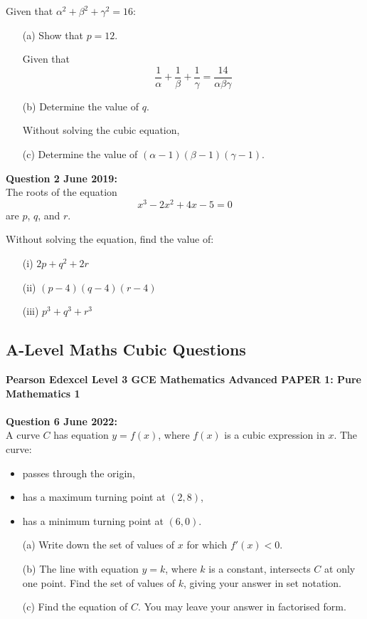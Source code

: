 \documentclass[12pt]{article}
\begin{document}
Given that \( \alpha^2 + \beta^2 + \gamma^2 = 16 \):

\begin{enumerate}
    \item[(a)] Show that \( p = 12 \).
    
    Given that 
    \[\frac{1}{\alpha} + \frac{1}{\beta} + \frac{1}{\gamma} = \frac{14}{\alpha \beta \gamma}\]
    \item[(b)] Determine the value of \( q \).
    
    Without solving the cubic equation,
    \item[(c)] Determine the value of \( (\alpha - 1)(\beta - 1)(\gamma - 1) \).
\end{enumerate}

\textbf{Question 2 June 2019:}\\
The roots of the equation 
\[x^3 - 2x^2 + 4x - 5 = 0\]
are \( p \), \( q \), and \( r \).

Without solving the equation, find the value of:
\begin{enumerate}
    \item[(i)] \( 2p + q^2 + 2r \)
    \item[(ii)] \( (p - 4)(q - 4)(r - 4) \)
    \item[(iii)] \( p^3 + q^3 + r^3 \)
\end{enumerate}



\subsection{A-Level Maths Cubic Questions}

\textbf{Pearson Edexcel Level 3 GCE Mathematics
Advanced PAPER 1: Pure Mathematics 1}\\\\
\textbf{Question 6 June 2022:}\\
A curve \( C \) has equation \( y = f(x) \), where \( f(x) \) is a cubic expression in \( x \). The curve:
\begin{itemize}
    \item passes through the origin,
    \item has a maximum turning point at \( (2, 8) \),
    \item has a minimum turning point at \( (6, 0) \).
\end{itemize}
\begin{enumerate}
    \item[(a)] Write down the set of values of \( x \) for which \( f'(x) < 0 \).    
    \item[(b)] The line with equation \( y = k \), where \( k \) is a constant, intersects \( C \) at only one point. Find the set of values of \( k \), giving your answer in set notation.    
    \item[(c)] Find the equation of \( C \). You may leave your answer in factorised form.
\end{enumerate}
\end{document}
